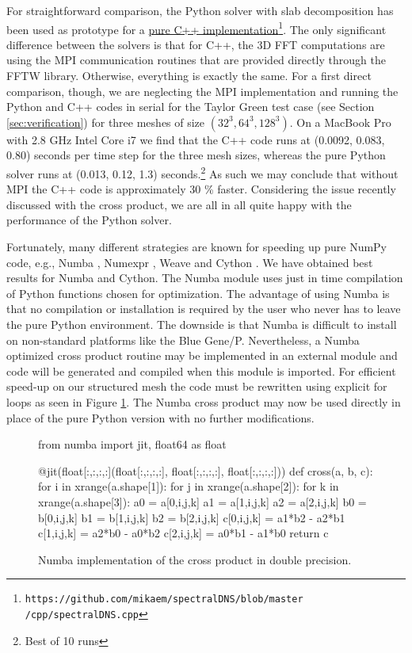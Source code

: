 \documentclass[final,3p,times,twocolumn]{elsarticle}
\begin{document}
For straightforward comparison, the Python solver with slab decomposition has been used as prototype for a
\href{https://github.com/mikaem/spectralDNS/blob/master/cpp/spectralDNS.cpp}{pure
 C++ 
implementation}\footnote{\texttt{https://github.com/mikaem/spectralDNS/blob/master
 /cpp/spectralDNS.cpp}}. The
only significant difference between the solvers is that for C++, the 3D FFT 
computations are using the MPI communication routines that are provided 
directly through the FFTW library. Otherwise, everything is exactly the same. 
For a first direct comparison, though, we are neglecting the MPI implementation 
and running the Python and C++ codes in serial for the Taylor Green test case 
(see Section \ref{sec:verification}) for three meshes of size $(32^3, 64^3, 
128^3)$. On a
MacBook Pro with 2.8 GHz Intel Core i7 we find that the C++ code runs at (0.0092, 0.083, 0.80) seconds per time step for the three mesh sizes, whereas the pure Python solver runs at (0.013, 0.12, 1.3) seconds.\footnote{Best of 10 runs} As such we may conclude that without MPI the C++ code is approximately 30 \% faster. Considering the issue recently discussed with the cross product, we are all in all quite happy with the performance of the Python solver.

Fortunately, many different strategies are known for speeding up pure 
NumPy code, e.g.,  Numba \cite{numba}, Numexpr \cite{numexpr}, Weave 
\cite{weave}
and Cython \cite{cython}. We have obtained best results for Numba 
and Cython. The {Numba} module uses just in time 
compilation of Python functions chosen for optimization. The advantage of using 
Numba is that no compilation or installation is required by the user 
who never has to leave the pure Python environment. The downside is that 
{Numba} is difficult to install on non-standard platforms like the Blue 
Gene/P. Nevertheless, a {Numba} optimized cross product routine may be 
implemented in an external module and code will be generated and 
compiled when this module is imported.  For efficient speed-up on our 
structured 
mesh the code must be rewritten using explicit for loops as seen in Figure 
\ref{fig:numba}. The {Numba} cross product may now be used directly in 
place of the pure Python version with no further modifications.
\begin{figure}
\begin{python}
from numba import jit, float64 as float

@jit(float[:,:,:,:](float[:,:,:,:], 
     float[:,:,:,:], float[:,:,:,:]))
def cross(a, b, c):
    for i in xrange(a.shape[1]):
        for j in xrange(a.shape[2]):
            for k in xrange(a.shape[3]):
                a0 = a[0,i,j,k]
                a1 = a[1,i,j,k]
                a2 = a[2,i,j,k]
                b0 = b[0,i,j,k]
                b1 = b[1,i,j,k]
                b2 = b[2,i,j,k]
                c[0,i,j,k] = a1*b2 - a2*b1
                c[1,i,j,k] = a2*b0 - a0*b2
                c[2,i,j,k] = a0*b1 - a1*b0
    return c
\end{python}
\caption{Numba implementation of the cross product in double 
precision.}\label{fig:numba}
\end{figure}
\end{document}
